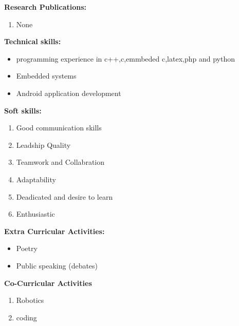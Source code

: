 \documentclass[10pt,a4paper]{article}
\begin{document}
\begin{flushleft}
	\textbf{Research Publications:}
	\begin{enumerate}
		\item None\\ \medskip
	\end{enumerate} 
	\textbf{Technical skills:}\\
	\begin{itemize}
		\item programming experience in c++,c,emmbeded c,latex,php and python\\
		\item  Embedded systems\\
		\item  Android application development\\
	\end{itemize}
	\textbf{Soft skills:}\\
	\begin{enumerate}
		\item Good communication skills\\
		\item Leadship Quality\\
		\item Teamwork and Collabration\\
		\item Adaptability\\
		\item Deadicated and desire to learn\\
		\item Enthusiastic\\
		
	\end{enumerate}
	\textbf{Extra Curricular Activities:}\\
	
	\begin{itemize}
		\item Poetry\\
		\item Public speaking (debates)\\
		
	\end{itemize}
	\textbf{Co-Curricular Activities}
		\begin{enumerate}
			\item Robotics\\
			\item coding
			
			
		\end{enumerate}
	
\end{flushleft}

 
\end{document}
